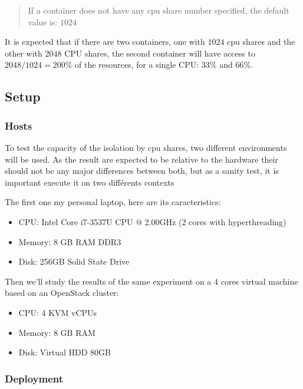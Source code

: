 \begin{quote}
If a container does not have any cpu share number specified, the default value
is: $1024$
\end{quote}

It is expected that if there are two containers, one with $1024$ cpu shares and
the other with $2048$ CPU shares, the second container will have access to
$2048/1024 = 200\%$ of the resources, for a single CPU: $33\%$ and $66\%$.

\subsection{Setup}

\subsubsection{Hosts}

To test the capacity of the isolation by cpu shares, two different environments
will be used. As the result are expected to be relative to the hardware their
should not be any major differences between both, but as a sanity test, it is
important execute it on two différents contexts

The first one my personal laptop, here are its caracteristics:

\begin{itemize}
	\item{CPU: Intel\textregistered \hspace{1pt} Core\texttrademark
	\hspace{1pt} i7-3537U CPU @ 2.00GHz (2 cores with hyperthreading)}
	\item{Memory: 8 GB RAM DDR3}
	\item{Disk: 256GB Solid State Drive}
\end{itemize}

Then we'll study the results of the same experiment on a 4 cores virtual
machine based on an OpenStack cluster:

\begin{itemize}
	\item{CPU: 4 KVM vCPUs}
	\item{Memory: 8 GB RAM}
	\item{Disk: Virtual HDD 80GB}
\end{itemize}

\subsubsection{Deployment}

